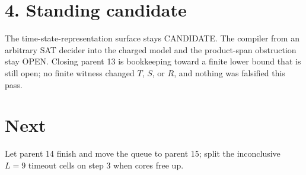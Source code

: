 \documentclass[11pt]{article}
\begin{document}
\section*{4. Standing candidate}
The time-state-representation surface stays CANDIDATE. The compiler from an arbitrary SAT decider into the charged model and the product-span obstruction stay OPEN. Closing parent 13 is bookkeeping toward a finite lower bound that is still open; no finite witness changed $T$, $S$, or $R$, and nothing was falsified this pass.

\section*{Next}
Let parent 14 finish and move the queue to parent 15; split the inconclusive $L=9$ timeout cells on step 3 when cores free up.
\end{document}
